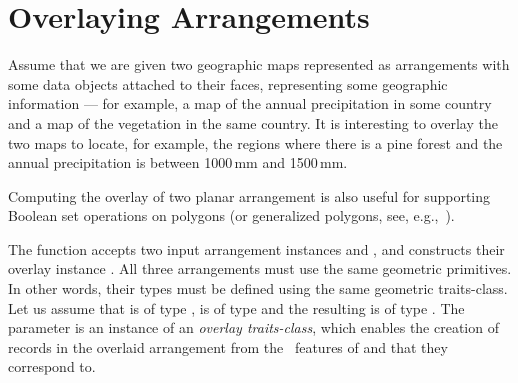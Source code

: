 \section{Overlaying Arrangements\label{arr_sec:overlay}}

Assume that we are given two geographic maps represented as
arrangements with some data objects attached to their faces,
representing some geographic information --- for example, a map of
the annual precipitation in some country and a map of the vegetation
in the same country. It is interesting to overlay the two maps to
locate, for example, the regions where there is a pine forest and
the annual precipitation is between 1000\,mm and 1500\,mm. 

Computing the overlay of two planar arrangement is also useful for
supporting Boolean set operations on polygons (or generalized polygons,
see, e.g.,~\cite{cgal:behhms-cbcab-02}).

The function  accepts
two input arrangement instances  and , and constructs
their overlay instance . All three arrangements must use the
same geometric primitives. In other words, their types must be defined 
using the same geometric traits-class. Let us assume that  is of 
type ,  is of type
 and the resulting  is of type 
. The  parameter is
an instance of an {\em overlay traits-class}, which enables the creation of
 records in the overlaid arrangement from the \dcel\ features
of  and  that they correspond to.

